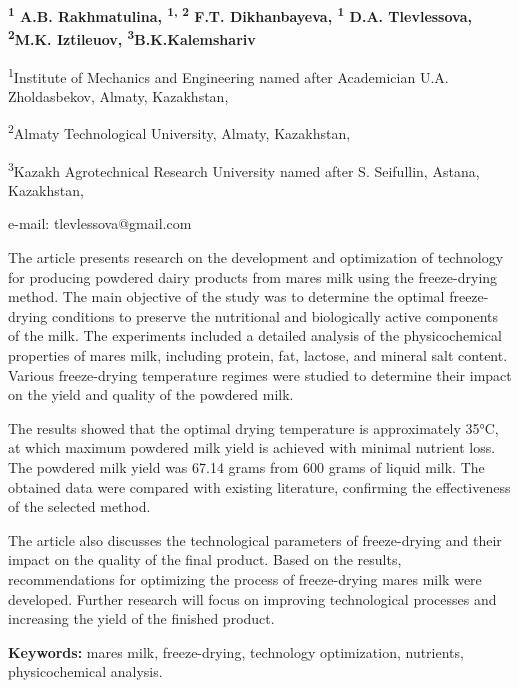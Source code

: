 \begin{center}

{\bfseries \textsuperscript{1} A.B. Rakhmatulina, \textsuperscript{1, 2}
F.T. Dikhanbayeva, \textsuperscript{1} D.A. Tlevlessova\envelope,}
{\bfseries \textsuperscript{2}M.K. Iztileuov, \textsuperscript{3}B.K.Kalemshariv}

\textsuperscript{1}Institute of Mechanics and Engineering named after
Academician U.A. Zholdasbekov, Almaty, Kazakhstan,

\textsuperscript{2}Almaty Technological University, Almaty, Kazakhstan,

\textsuperscript{3}Kazakh Agrotechnical Research University named after
S. Seifullin, Astana, Kazakhstan,

e-mail: tlevlessova@gmail.com
\end{center}

The article presents research on the development and optimization of
technology for producing powdered dairy products from
mare\textquotesingle s milk using the freeze-drying method. The main
objective of the study was to determine the optimal freeze-drying
conditions to preserve the nutritional and biologically active
components of the milk. The experiments included a detailed analysis of
the physicochemical properties of mare\textquotesingle s milk, including
protein, fat, lactose, and mineral salt content. Various freeze-drying
temperature regimes were studied to determine their impact on the yield
and quality of the powdered milk.

The results showed that the optimal drying temperature is approximately
35°C, at which maximum powdered milk yield is achieved with minimal
nutrient loss. The powdered milk yield was 67.14 grams from 600 grams of
liquid milk. The obtained data were compared with existing literature,
confirming the effectiveness of the selected method.

The article also discusses the technological parameters of freeze-drying
and their impact on the quality of the final product. Based on the
results, recommendations for optimizing the process of freeze-drying
mare\textquotesingle s milk were developed. Further research will focus
on improving technological processes and increasing the yield of the
finished product.

{\bfseries Keywords:} mare\textquotesingle s milk, freeze-drying,
technology optimization, nutrients, physicochemical analysis.


